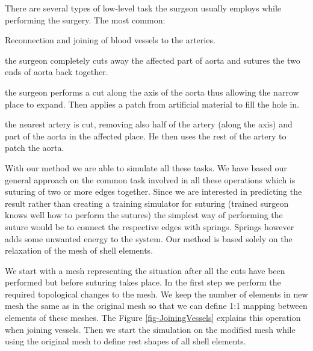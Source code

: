 There are several types of low-level task the surgeon usually employs while
performing the surgery.
The most common:

\begin{description}
  \item Reconnection and joining of blood vessels to the arteries.

  \item[End to end aortoplasty:] the surgeon completely cuts away the
    affected part of aorta and sutures the two ends of aorta back together.

  \item[Patch aortoplasty:] the surgeon performs a cut along the axis of
    the aorta thus allowing the narrow place to expand. Then applies a
    patch from artificial material to fill the hole in.

  \item[Subclavian flap aortoplasty:] the nearest artery is cut,
    removing also half of the artery (along the axis) and part of the
    aorta in the affected place. He then uses the rest of the artery to
    patch the aorta.

\end{description}

With our method we are able to simulate all these tasks.
We have based our general approach on the common task involved in all these operations which is suturing of two or more edges together.
Since we are interested in predicting the result rather than creating a training simulator for suturing (trained surgeon knows well how to perform the sutures) the simplest way of performing the suture would be to connect the respective edges with springs. 
Springs however adds some unwanted energy to the system. 
Our method is based solely on the relaxation of the mesh of shell elements.

We start with a mesh representing the situation after all the cuts have been performed but before suturing takes place. 
In the first step we perform the required topological changes to the mesh. We keep the number of elements in new mesh the same as in the original mesh so that we can define 1:1 mapping between elements of these meshes.
The Figure \ref{fig-JoiningVessels} explains this operation when joining vessels. 
Then we start the simulation on the modified mesh while using the original mesh to define rest shapes of all shell elements. 

